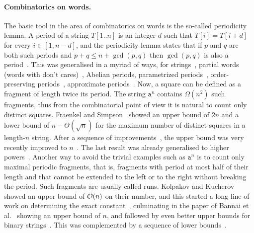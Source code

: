 \paragraph{Combinatorics on words.} The basic tool in the area of combinatorics on words is the so-called
periodicity lemma. A period of a string $T[1..n]$ is an integer $d$ such that $T[i]=T[i+d]$ for every $i\in [1,n-d]$,
and the periodicity lemma states that if $p$ and $q$ are both such periods and $p+q\leq n+\gcd(p,q)$ then 
$\gcd(p,q)$ is also a period~\cite{Fine1965}. 
This was generalised in a myriad of ways, for strings~\cite{Castelli1999,Justin2000,Tijdeman2003},
partial words (words with don't cares)~\cite{Berstel1999,Blanchet-Sadri2008,Blanchet-Sadri2002,Shur2004,Shur2001,Idiatulina2014,Kociumaka2022},
Abelian periods\cite{Constantinescu2006,Blanchet-Sadri2013}, parametrized periods~\cite{Apostolico2008},
order-preserving periods~\cite{Matsuoka2016,Gourdel2020}, approximate periods~\cite{Amir2010,Amir2012,Amir2015}.
Now, a square can be defined as a fragment of length twice its period. 
The string $\texttt{a}^{n}$ contains $\Omega(n^{2})$ such fragments,
thus from the combinatorial point of view it is natural to count only distinct squares.
Fraenkel and Simpson~\cite{Fraenkel1998} showed an upper bound of $2n$ and a lower bound of $n-\Theta(\sqrt{n})$ for the maximum number of distinct squares in a length-$n$ string.
After a sequence of improvements~\cite{Ilie2007,Deza2015,Thierry2020}, the upper bound was very recently improved to $n$~\cite{Brlek2022}.
The last result was already generalised to higher powers~\cite{Li2022}.
Another way to avoid the trivial examples such as $\texttt{a}^{n}$ is to count only maximal periodic fragments,
that is, fragments with period at most half of their length and that cannot be extended to the left or to the right without
breaking the period. Such fragments are usually called runs. Kolpakov and Kucherov~\cite{Kolpakov1999} showed
an upper bound of $\mathcal{O}(n)$ on their number, and this started a long line of work on determining the exact
constant~\cite{Rytter2006,Puglisi2008,Crochemore2008,Giraud2008,Giraud2009,Crochemore2011}, culminating
in the paper of Bannai et al.~\cite{Bannai2017} showing an upper bound of $n$, and followed by even better upper bounds
for binary strings~\cite{Fischer2015,Holub2017}. This was complemented by a sequence of 
lower bounds~\cite{Franek2008,Matsubara2008,Matsubara2009,Simpson2010}.

